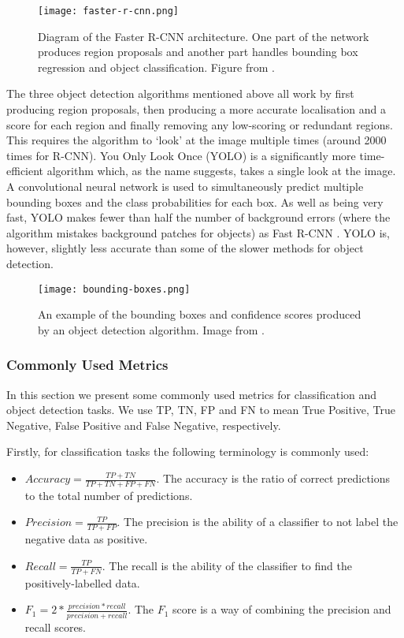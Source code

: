\documentclass[../interim.tex]{subfiles}
\begin{document}
\begin{figure}
  \centering
  \texttt{[image: faster-r-cnn.png]}
  \caption{Diagram of the Faster R-CNN architecture. One part of the network produces region proposals and another part handles bounding box regression and object classification. Figure from \cite{cnn-uses:faster-r-cnn}.}
  \label{fig:fasterrcnn}
\end{figure}

The three object detection algorithms mentioned above all work by first producing region proposals, then producing a more accurate localisation and a score for each region and finally removing any low-scoring or redundant regions. This requires the algorithm to `look' at the image multiple times (around 2000 times for R-CNN). You Only Look Once (YOLO) is a significantly more time-efficient algorithm which, as the name suggests, takes a single look at the image. A convolutional neural network is used to simultaneously predict multiple bounding boxes and the class probabilities for each box. As well as being very fast, YOLO makes fewer than half the number of background errors (where the algorithm mistakes background patches for objects) as Fast R-CNN \cite{yolo}. YOLO is, however, slightly less accurate than some of the slower methods for object detection\cite{cnn-uses:yolo-v3}.

\begin{figure}
  \centering
  \texttt{[image: bounding-boxes.png]}
  \caption{An example of the bounding boxes and confidence scores produced by an object detection algorithm. Image from \cite{obj-detection-examples}.}
  \label{fig:bounding-boxes}
\end{figure}

\subsubsection{Commonly Used Metrics}

In this section we present some commonly used metrics for classification and object detection tasks. We use TP, TN, FP and FN to mean True Positive, True Negative, False Positive and False Negative, respectively.

Firstly, for classification tasks the following terminology is commonly used:
\begin{itemize}
  \item $Accuracy = \frac{TP + TN}{TP + TN + FP + FN}$. The accuracy is the ratio of correct predictions to the total number of predictions.

  \item $Precision = \frac{TP}{TP + FP}$. The precision is the ability of a classifier to not label the negative data as positive.

  \item $Recall = \frac{TP}{TP + FN}$. The recall is the ability of the classifier to find the positively-labelled data.

  \item $F_1 = 2 * \frac{precision * recall}{precision + recall}$. The $F_1$ score is a way of combining the precision and recall scores.
\end{itemize}
\end{document}
